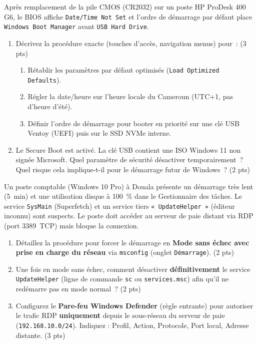 \documentclass[11pt]{article}
\begin{document}
\begin{exercice}
Après remplacement de la pile CMOS (CR2032) sur un poste HP ProDesk 400 G6, le BIOS affiche \texttt{Date/Time Not Set} et l'ordre de démarrage par défaut place \texttt{Windows Boot Manager} avant \texttt{USB Hard Drive}.
\begin{enumerate}
    \item Décrivez la procédure exacte (touches d'accès, navigation menus) pour~: (3 pts)
    \begin{enumerate}
        \item Rétablir les paramètres par défaut optimisés (\texttt{Load Optimized Defaults}).
        \item Régler la date/heure sur l'heure locale du Cameroun (UTC+1, pas d'heure d'été).
        \item Définir l'ordre de démarrage pour booter en priorité sur une clé USB Ventoy (UEFI) puis sur le SSD NVMe interne.
    \end{enumerate}
    \item Le Secure Boot est activé. La clé USB contient une ISO Windows 11 non signée Microsoft. Quel paramètre de sécurité désactiver temporairement~? Quel risque cela implique-t-il pour le démarrage futur de Windows~? (2 pts)
\end{enumerate}
\end{exercice}

\begin{exercice}
Un poste comptable (Windows 10 Pro) à Douala présente un démarrage très lent (\SI{5}{min}) et une utilisation disque à \SI{100}{\%} dans le Gestionnaire des tâches. Le service \texttt{SysMain} (Superfetch) et un service tiers \texttt{« UpdateHelper »} (éditeur inconnu) sont suspects. Le poste doit accéder au serveur de paie distant via RDP (port \SI{3389}{TCP}) mais bloque la connexion.
\begin{enumerate}
    \item Détaillez la procédure pour forcer le démarrage en \textbf{Mode sans échec avec prise en charge du réseau} via \texttt{msconfig} (onglet \texttt{Démarrage}). (2 pts)
    \item Une fois en mode sans échec, comment désactiver \textbf{définitivement} le service \texttt{UpdateHelper} (ligne de commande \texttt{sc} ou \texttt{services.msc}) afin qu'il ne redémarre pas en mode normal~? (2 pts)
    \item Configurez le \textbf{Pare-feu Windows Defender} (règle entrante) pour autoriser le trafic RDP \textbf{uniquement} depuis le sous-réseau du serveur de paie (\texttt{192.168.10.0/24}). Indiquez : Profil, Action, Protocole, Port local, Adresse distante. (3 pts)
\end{enumerate}
\end{exercice}
\end{document}
